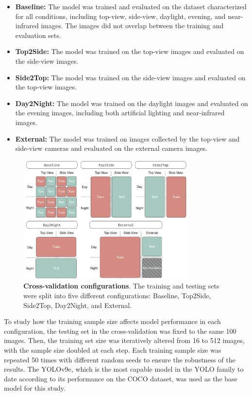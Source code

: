 \begin{itemize}
    \item \textbf{Baseline:} The model was trained and evaluated on the dataset characterized for all conditions, including top-view, side-view, daylight, evening, and near-infrared images. The images did not overlap between the training and evaluation sets.
    \item \textbf{Top2Side:} The model was trained on the top-view images and evaluated on the side-view images.
    \item \textbf{Side2Top:} The model was trained on the side-view images and evaluated on the top-view images.
    \item \textbf{Day2Night:} The model was trained on the daylight images and evaluated on the evening images, including both artificial lighting and near-infrared images.
    \item \textbf{External:} The model was trained on images collected by the top-view and side-view cameras and evaluated on the external camera images.
\end{itemize}

\begin{figure}[h]
    \centering
    \includegraphics[width=0.8\textwidth]{figure_2.jpg}
    \caption{\textbf{Cross-validation configurations}. The training and testing sets were split into five different configurations: Baseline, Top2Side, Side2Top, Day2Night, and External.}
    \label{fig:splits}
\end{figure}

To study how the training sample size affects model performance in each configuration, the testing set in the cross-validation was fixed to the same 100 images. Then, the training set size was iteratively altered from 16 to 512 images, with the sample size doubled at each step. Each training sample size was repeated 50 times with different random seeds to ensure the robustness of the results. The YOLOv9e, which is the most capable model in the YOLO family to date according to its performance on the COCO dataset, was used as the base model for this study.

